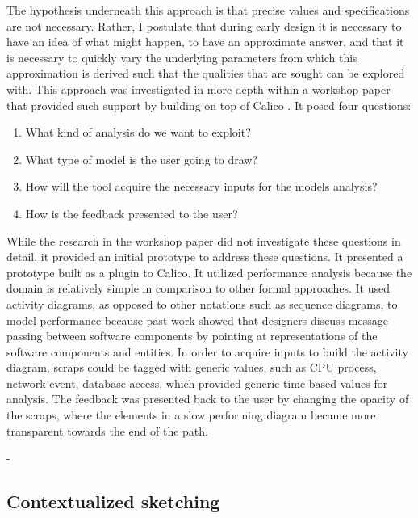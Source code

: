 \documentclass[12pt,fleqn]{ucithesis}
\begin{document}
The hypothesis underneath this approach is that precise values and specifications are not necessary. Rather, I postulate that during early design it is necessary to have an idea of what might happen, to have an approximate answer, and that it is necessary to quickly vary the underlying parameters from which this approximation is derived such that the qualities that are sought can be explored with. 
This approach was investigated in more depth within a workshop paper that provided such support by building on top of Calico \cite{mottalightweight}. It posed four questions:

\begin{enumerate}
	\item What kind of analysis do we want to exploit? 
	\item What type of model is the user going to draw? 
	\item How will the tool acquire the necessary inputs for the models analysis? 
	\item How is the feedback presented to the user?
\end{enumerate}

While the research in the workshop paper did not investigate these questions in detail, it provided an initial prototype to address these questions. It presented a prototype built as a plugin to Calico. It utilized performance analysis because the domain is relatively simple in comparison to other formal approaches. It used activity diagrams, as opposed to other notations such as sequence diagrams, to model performance because past work showed that designers discuss message passing between software components by pointing at representations of the software components and entities. In order to acquire inputs to build the activity diagram, scraps could be tagged with generic values, such as CPU process, network event, database access, which provided generic time-based values for analysis. The feedback was presented back to the user by changing the opacity of the scraps, where the elements in a slow performing diagram became more transparent towards the end of the path.

%
- 

\subsection{Contextualized sketching}
\end{document}
